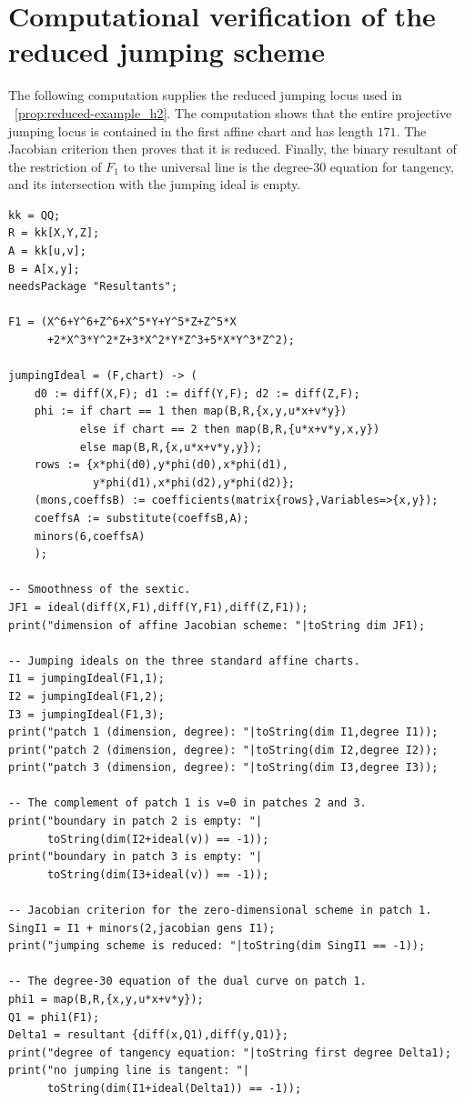 \documentclass[a4paper,12pt,twoside,reqno]{amsart}
\makeatletter
\numberwithin{equation}{section}
\def\cr@pref#1:#2\@nil{#1}
\newcommand{\cr@tsing}[1]{\@nameuse{cr@map@\cr@pref#1:\@nil}}
\newcommand{\Cref}[1]{\cr@tsing{#1}~\ref{#1}}
\theoremstyle{plain}
\theoremstyle{definition}
\theoremstyle{plain}
\theoremstyle{definition}
\makeatother
\begin{document}
\appendix

\section{Computational verification of the reduced jumping scheme}
\label{app:jumping}\label{app:reduced-jumping}

The following computation supplies the reduced jumping locus used
in \Cref{prop:reduced-example_h2}. The computation shows that the entire projective jumping
locus is contained in the first affine chart and has length $171$.  The
Jacobian criterion then proves that it is reduced. Finally, the binary resultant of the restriction of $F_1$ to the universal line is the degree-$30$
equation for tangency, and its intersection with the jumping ideal is empty.

\begingroup
\scriptsize
\begin{verbatim}
kk = QQ;
R = kk[X,Y,Z];
A = kk[u,v];
B = A[x,y];
needsPackage "Resultants";

F1 = (X^6+Y^6+Z^6+X^5*Y+Y^5*Z+Z^5*X
      +2*X^3*Y^2*Z+3*X^2*Y*Z^3+5*X*Y^3*Z^2);

jumpingIdeal = (F,chart) -> (
    d0 := diff(X,F); d1 := diff(Y,F); d2 := diff(Z,F);
    phi := if chart == 1 then map(B,R,{x,y,u*x+v*y})
           else if chart == 2 then map(B,R,{u*x+v*y,x,y})
           else map(B,R,{x,u*x+v*y,y});
    rows := {x*phi(d0),y*phi(d0),x*phi(d1),
             y*phi(d1),x*phi(d2),y*phi(d2)};
    (mons,coeffsB) := coefficients(matrix{rows},Variables=>{x,y});
    coeffsA := substitute(coeffsB,A);
    minors(6,coeffsA)
    );

-- Smoothness of the sextic.
JF1 = ideal(diff(X,F1),diff(Y,F1),diff(Z,F1));
print("dimension of affine Jacobian scheme: "|toString dim JF1);

-- Jumping ideals on the three standard affine charts.
I1 = jumpingIdeal(F1,1);
I2 = jumpingIdeal(F1,2);
I3 = jumpingIdeal(F1,3);
print("patch 1 (dimension, degree): "|toString(dim I1,degree I1));
print("patch 2 (dimension, degree): "|toString(dim I2,degree I2));
print("patch 3 (dimension, degree): "|toString(dim I3,degree I3));

-- The complement of patch 1 is v=0 in patches 2 and 3.
print("boundary in patch 2 is empty: "|
      toString(dim(I2+ideal(v)) == -1));
print("boundary in patch 3 is empty: "|
      toString(dim(I3+ideal(v)) == -1));

-- Jacobian criterion for the zero-dimensional scheme in patch 1.
SingI1 = I1 + minors(2,jacobian gens I1);
print("jumping scheme is reduced: "|toString(dim SingI1 == -1));

-- The degree-30 equation of the dual curve on patch 1.
phi1 = map(B,R,{x,y,u*x+v*y});
Q1 = phi1(F1);
Delta1 = resultant {diff(x,Q1),diff(y,Q1)};
print("degree of tangency equation: "|toString first degree Delta1);
print("no jumping line is tangent: "|
      toString(dim(I1+ideal(Delta1)) == -1));
\end{verbatim}
\endgroup
\end{document}
